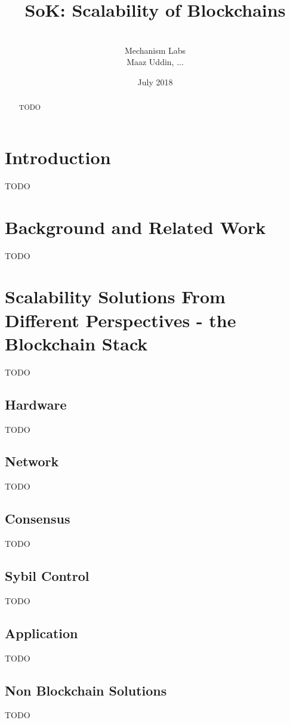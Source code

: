 \documentclass{article}
\title{SoK: Scalability of Blockchains}
\author{
\\ \small{Mechanism Labs} \\ \small{Maaz Uddin, ...}}
\date{July 2018}
\begin{document}
\maketitle

\begin{abstract}
TODO
\end{abstract}

\maketitle

\section{Introduction}
TODO

\section{Background and Related Work}
TODO

\section{Scalability Solutions From Different Perspectives - the Blockchain Stack}
TODO

\subsection{Hardware}
TODO

\subsection{Network}
TODO

\subsection{Consensus}
TODO

\subsection{Sybil Control}
TODO

\subsection{Application}
TODO

\subsection{Non Blockchain Solutions}
TODO
\end{document}
